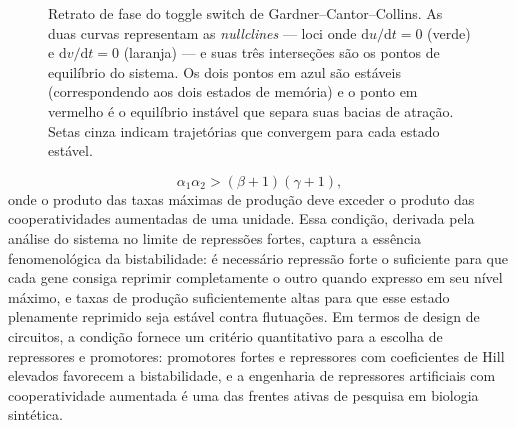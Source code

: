 \begin{figure}[htbp]
\centering
{}
\caption{Retrato de fase do toggle switch de Gardner--Cantor--Collins. As duas curvas representam as \emph{nullclines} --- loci onde $\mathrm{d}u/\mathrm{d}t = 0$ (verde) e $\mathrm{d}v/\mathrm{d}t = 0$ (laranja) --- e suas três interseções são os pontos de equilíbrio do sistema. Os dois pontos em azul são estáveis (correspondendo aos dois estados de memória) e o ponto em vermelho é o equilíbrio instável que separa suas bacias de atração. Setas cinza indicam trajetórias que convergem para cada estado estável.}
\label{fig:14-toggle}
\end{figure}

\begin{equation*}
\alpha_1 \alpha_2 > (\beta + 1)(\gamma + 1),
\end{equation*}
onde o produto das taxas máximas de produção deve exceder o produto das cooperatividades aumentadas de uma unidade. Essa condição, derivada pela análise do sistema no limite de repressões fortes, captura a essência fenomenológica da bistabilidade: é necessário repressão forte o suficiente para que cada gene consiga reprimir completamente o outro quando expresso em seu nível máximo, e taxas de produção suficientemente altas para que esse estado plenamente reprimido seja estável contra flutuações. Em termos de design de circuitos, a condição fornece um critério quantitativo para a escolha de repressores e promotores: promotores fortes e repressores com coeficientes de Hill elevados favorecem a bistabilidade, e a engenharia de repressores artificiais com cooperatividade aumentada é uma das frentes ativas de pesquisa em biologia sintética.

